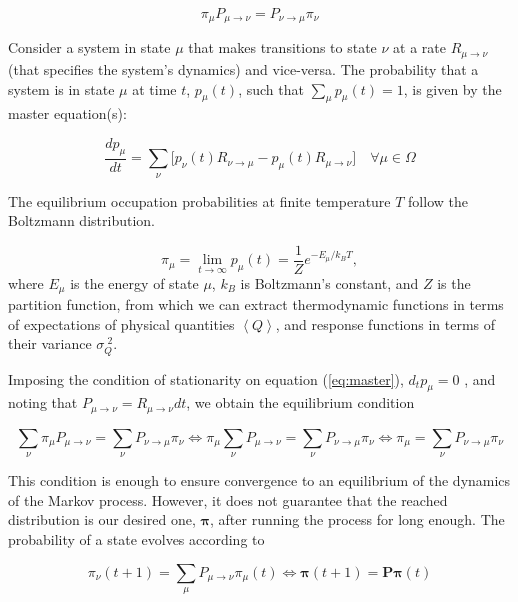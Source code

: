\begin{equation}\label{eq:detBal}
\pi_\mu P_{\mu \rightarrow \nu} = P_{\nu \rightarrow \mu} \pi_\nu
\end{equation}

Consider a system in state $\mu$ that makes transitions to state $\nu$ at a rate $R_{\mu \rightarrow  \nu}$ (that specifies the system's dynamics) and vice-versa.
The probability that a system is in state $\mu$ at time $t$, $p_\mu (t)$, such that $\sum_\mu p_\mu (t) = 1$, is given by the master equation(s):

\begin{equation}\label{eq:master}
\frac{d p_\mu}{dt} = \sum_\nu \big[ p_\nu (t) R_{\nu \rightarrow \mu} - p_\mu (t) R_{\mu \rightarrow \nu} \big] \quad \forall \mu \in \Omega
\end{equation}

The equilibrium occupation probabilities at finite temperature $T$ follow the Boltzmann distribution.

\begin{equation}
\pi_\mu = \lim_{t \rightarrow \infty} p_\mu (t) = \frac{1}{Z} e^{ - E_\mu / k_B T} ,
\end{equation}
where $E_\mu$ is the energy of state $\mu$, $k_B$ is Boltzmann's constant, and $Z$ is the partition function, from which we can extract thermodynamic functions in terms of expectations of physical quantities $\left\langle Q \right\rangle$, and response functions in terms of their variance $\sigma_Q^{\,\, 2}$.

Imposing the condition of stationarity on equation (\ref{eq:master}), $d_t p_\mu = 0$ , and noting that $ P_{\mu\rightarrow \nu} = R_{\mu\rightarrow \nu}  dt$, we obtain the equilibrium condition

\begin{equation}\label{eq:equilibrium}
\sum_\nu \pi_\mu P_{\mu \rightarrow \nu} = \sum_\nu P_{\nu \rightarrow \mu} \pi_\nu \iff \pi_\mu \sum_\nu P_{\mu \rightarrow \nu} = \sum_\nu P_{\nu \rightarrow \mu} \pi_\nu \iff \pi_\mu = \sum_\nu P_{\nu \rightarrow \mu} \pi_\nu
\end{equation}

This condition is enough to ensure convergence to an equilibrium of the dynamics of the Markov process.
However, it does not guarantee that the reached distribution is our desired one, $\bm \pi$, after running the process for long enough.
The probability of a state evolves according to

\begin{equation}
\pi_\nu ( t + 1 ) = \sum_\mu P_{\mu\rightarrow\nu}  \pi_\mu ( t ) \iff \bm \pi ( t + 1 ) = \bm P \bm \pi ( t )
\end{equation}

